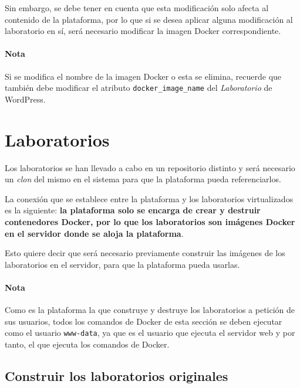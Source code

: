             Sin embargo, se debe tener en cuenta que esta modificación solo afecta al contenido de la plataforma, por lo que si se desea aplicar alguna modificación al laboratorio en sí, será necesario modificar la imagen Docker correspondiente.

            \paragraph{Nota}

                Si se modifica el nombre de la imagen Docker o esta se elimina, recuerde que también debe modificar el atributo \texttt{docker\_image\_name} del \textit{Laboratorio} de WordPress.

            \newpage


    \section{Laboratorios}

        Los laboratorios se han llevado a cabo en un repositorio distinto y será necesario un \textit{clon} del mismo en el sistema para que la plataforma pueda referenciarlos.

        La conexión que se establece entre la plataforma y los laboratorios virtualizados es la siguiente: \textbf{la plataforma solo se encarga de crear y destruir contenedores Docker, por lo que los laboratorios son imágenes Docker en el servidor donde se aloja la plataforma}.

        Esto quiere decir que será necesario previamente construir las imágenes de los laboratorios en el servidor, para que la plataforma pueda usarlas.

        \paragraph{Nota}

            Como es la plataforma la que construye y destruye los laboratorios a petición de sus usuarios, todos los comandos de Docker de esta sección se deben ejecutar como el usuario \texttt{www-data}, ya que es el usuario que ejecuta el servidor web y por tanto, el que ejecuta los comandos de Docker.

        \subsection{Construir los laboratorios originales}


